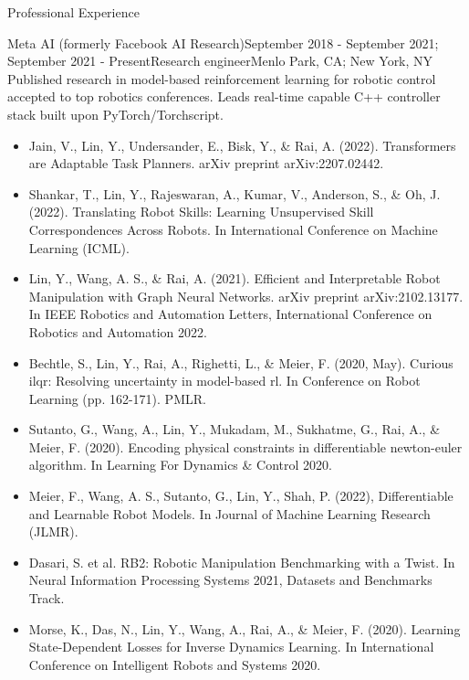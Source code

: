 \documentclass[8pt]{resume}
\begin{document}
\begin{rSection}{Professional Experience}

  \begin{rSubsection}{Meta AI (formerly Facebook AI Research)}{September 2018 - September 2021; September 2021 - Present}{Research engineer}{Menlo Park, CA; New York, NY}
  Published research in model-based reinforcement learning for robotic control accepted to top robotics conferences. Leads real-time capable C++ controller stack built upon PyTorch/Torchscript.
  \begin{itemize}
    \item Jain, V., Lin, Y., Undersander, E., Bisk, Y., \& Rai, A. (2022). Transformers are Adaptable Task Planners. arXiv preprint arXiv:2207.02442.
    \item Shankar, T., Lin, Y., Rajeswaran, A., Kumar, V., Anderson, S., \& Oh, J. (2022). Translating Robot Skills: Learning Unsupervised Skill Correspondences Across Robots. In International Conference on Machine Learning (ICML).
    \item Lin, Y., Wang, A. S., \& Rai, A. (2021). Efficient and Interpretable Robot Manipulation with Graph Neural Networks. arXiv preprint arXiv:2102.13177. In IEEE Robotics and Automation Letters, International Conference on Robotics and Automation 2022.
    \item Bechtle, S., Lin, Y., Rai, A., Righetti, L., \& Meier, F. (2020, May). Curious ilqr: Resolving uncertainty in model-based rl. In Conference on Robot Learning (pp. 162-171). PMLR.
    \item Sutanto, G., Wang, A., Lin, Y., Mukadam, M., Sukhatme, G., Rai, A., \& Meier, F. (2020). Encoding physical constraints in differentiable newton-euler algorithm. In Learning For Dynamics \& Control 2020.
    \item Meier, F., Wang, A. S., Sutanto, G., Lin, Y., Shah, P. (2022), Differentiable and Learnable Robot Models. In Journal of Machine Learning Research (JLMR).
    \item Dasari, S. et al. RB2: Robotic Manipulation Benchmarking with a Twist. In Neural Information Processing Systems 2021, Datasets and Benchmarks Track.
    \item Morse, K., Das, N., Lin, Y., Wang, A., Rai, A., \& Meier, F. (2020). Learning State-Dependent Losses for Inverse Dynamics Learning. In International Conference on Intelligent Robots and Systems 2020.
  \end{itemize}
\end{rSubsection}


\end{rSection}
\end{document}
